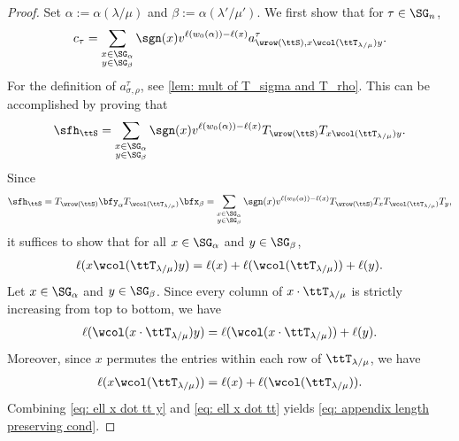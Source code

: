 \documentclass[12pt, reqno]{amsart}
\theoremstyle{plain}
\theoremstyle{definition}
\numberwithin{equation}{section}
\numberwithin{figure}{section}
\numberwithin{table}{section}
\begin{document}
\begin{proof}
Set $\alpha := \alpha(\lambda/\mu)$ and $\beta := \alpha(\lambda'/\mu')$.
We first show that for $\tau \in \SG_n$,
\begin{align}\label{eq: c tau coeff is sum of a tau sig rho}
c_\tau = \sum_{\substack{
x \in \SG_\alpha\\ y \in \SG_\beta}} \sgn(x) v^{\ell(w_0(\alpha)) - \ell(x)} a^\tau_{\wrow(\ttS), x \wcol(\ttT_{\lambda/\mu}) y}.
\end{align}
For the definition of
$a^\tau_{\sigma,\rho}$, see
\cref{lem: mult of T_sigma and T_rho}.
This can be accomplished by proving that
\begin{align}\label{eq: sfh ttS in another form}
\sfh_{\ttS}  =  \sum_{\substack{
x \in \SG_\alpha\\ y \in \SG_\beta}
}\sgn(x) v^{\ell(w_0(\alpha)) - \ell(x)} T_{\wrow(\ttS)} T_{x \wcol(\ttT_{\lambda/\mu}) y}.
\end{align}
Since
\[
\sfh_{\ttS} = T_{\wrow(\ttS)} \bfy_{\alpha}T_{\wcol(\ttT_{\lambda/\mu})}\bfx_{\beta} =  \sum_{\substack{
x \in \SG_\alpha\\ y \in \SG_\beta}
}\sgn(x) v^{\ell(w_0(\alpha)) - \ell(x)} T_{\wrow(\ttS)} T_x  T_{\wcol(\ttT_{\lambda/\mu})} T_y,
\]
it suffices to show that for all $x \in \SG_\alpha$ and $y \in \SG_\beta$, 
\begin{align}\label{eq: appendix length preserving cond}
\ell(x \wcol(\ttT_{\lambda/\mu})y) = \ell(x) + \ell(\wcol(\ttT_{\lambda/\mu})) + \ell(y).    
\end{align}
Let $x \in \SG_{\alpha}$ and $y \in \SG_{\beta}$.
Since every column of $x\cdot\ttT_{\lambda/\mu}$ is strictly increasing from top to bottom, we have
\begin{align}\label{eq: ell x dot tt y}
\ell(\wcol(x \cdot \ttT_{\lambda/\mu}) y) = 
\ell(\wcol(x \cdot \ttT_{\lambda/\mu})) + \ell(y).
\end{align}
Moreover, since $x$ permutes the entries within each row of $\ttT_{\lambda/\mu}$, we have
\begin{align}\label{eq: ell x dot tt}
\ell(x \wcol(\ttT_{\lambda/\mu})) = \ell(x) + \ell(\wcol(\ttT_{\lambda/\mu})).
\end{align}
Combining \cref{eq: ell x dot tt y} and \cref{eq: ell x dot tt} yields \cref{eq: appendix length preserving cond}.




\end{proof}
\end{document}

